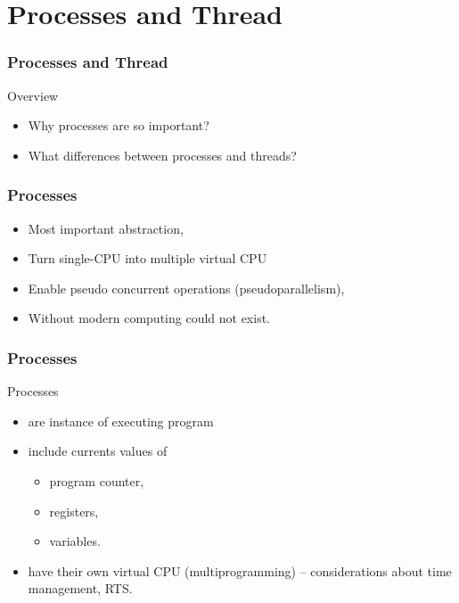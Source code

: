\section{Processes and Thread}
  \begin{frame}
    \frametitle{Processes and Thread}
        \begin{block}{Overview}
          \begin{itemize}
            \item Why processes are so important?
            \item What differences between processes and threads?
          \end{itemize}
        \end{block}
  \end{frame}

  \begin{frame}
    \frametitle{Processes}
        \begin{itemize}
          \item Most important abstraction,
          \item Turn single-CPU into multiple virtual CPU
          \item Enable pseudo concurrent operations (pseudoparallelism),
          \item Without modern computing could not exist.
        \end{itemize}
  \end{frame}

  \begin{frame}
    \frametitle{Processes}
        \begin{block}{Processes}
          \begin{itemize}
            \item are instance of executing program
            \item include currents values of
              \begin{itemize}
                \item program counter,
                \item registers,
                \item variables.
              \end{itemize}
            \item have their own virtual CPU (multiprogramming) -- considerations about time management, RTS.
          \end{itemize}
        \end{block}
  \end{frame}

